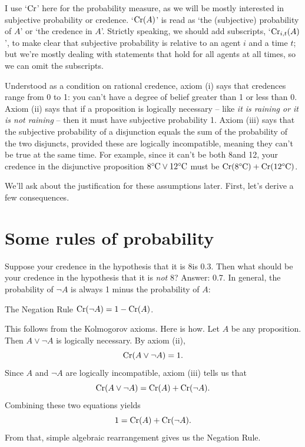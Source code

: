 I use `$\Cr$' here for the probability measure, as we will be mostly
interested in subjective probability or credence. `$\Cr(A)$' is read as `the
(subjective) probability of $A$' or `the credence in $A$'. Strictly speaking, we
should add subscripts, `$\Cr_{i,t}(A)$', to make clear that subjective
probability is relative to an agent $i$ and a time $t$; but we're mostly dealing
with statements that hold for all agents at all times, so we can omit the
subscripts.

Understood as a condition on rational credence, axiom (i) says that credences
range from 0 to 1: you can't have a degree of belief greater than 1 or less than
0. Axiom (ii) says that if a proposition is logically necessary -- like \emph{it
  is raining or it is not raining} -- then it must have subjective probability
1. Axiom (iii) says that the subjective probability of a disjunction
equals the sum of the probability of the two disjuncts, provided these are
logically incompatible, meaning they can't be true at the same time. For
example, since it can't be both 8\celsius and 12\celsius, your credence in the
disjunctive proposition $8\celsius \lor 12\celsius$ must be
$\Cr(8\celsius) + \Cr(12\celsius)$.

We'll ask about the justification for these assumptions later. First,
let's derive a few consequences.


\section{Some rules of probability}

Suppose your credence in the hypothesis that it is 8\celsius is
0.3. Then what should be your credence in the hypothesis that it is
\emph{not} 8\celsius? Answer: 0.7. In general, the probability of
$\neg A$ is always 1 minus the probability of $A$:

\begin{genericthm}{The Negation Rule}
  $\Cr(\neg A) = 1 - \Cr(A)$.
\end{genericthm}

This follows from the Kolmogorov axioms. Here is how. Let $A$ be any
proposition. Then $A \lor \neg A$ is logically necessary. By axiom (ii),
\[
  \Cr(A \lor \neg A) = 1.
\]
Since  $A$ and $\neg A$ are logically incompatible, axiom (iii) tells us that
\[
  \Cr(A \lor \neg A) = \Cr(A) + \Cr(\neg A).
\]
Combining these two equations yields
\[
  1 = \Cr(A) + \Cr(\neg A).
\]
From that, simple algebraic rearrangement gives us the Negation Rule.

